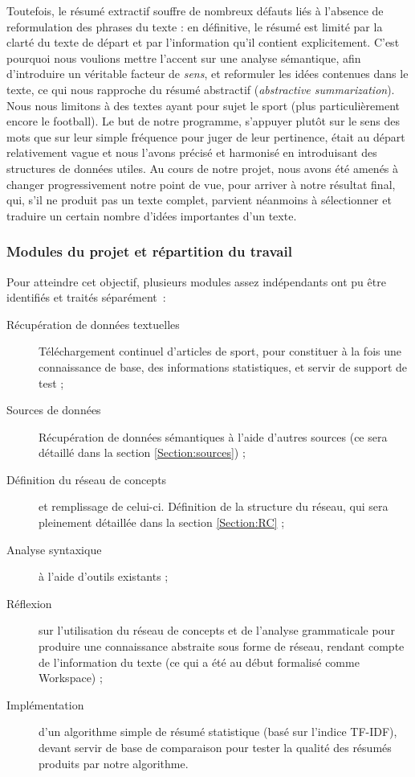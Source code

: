 \documentclass[a4paper, 12pt]{article}
\begin{document}
Toutefois, le résumé extractif souffre de nombreux défauts liés à l'absence de reformulation des phrases du texte : en définitive, le résumé est limité par la clarté du texte de départ et par l'information qu'il contient explicitement. C'est pourquoi nous voulions mettre l'accent sur une analyse sémantique, afin d'introduire un véritable facteur de \textit{sens}, et reformuler les idées contenues dans le texte, ce qui nous rapproche du résumé abstractif (\textit{abstractive summarization}).\\

Nous nous limitons à des textes ayant pour sujet le sport (plus particulièrement encore le football). Le but de notre programme, s'appuyer plutôt sur le sens des mots que sur leur simple fréquence pour juger de leur pertinence, était au départ relativement vague et nous l'avons précisé et harmonisé en introduisant des structures de données utiles. Au cours de notre projet, nous avons été amenés à changer progressivement notre point de vue, pour arriver à notre résultat final, qui, s'il ne produit pas un texte complet, parvient néanmoins à sélectionner et traduire un certain nombre d'idées importantes d'un texte.


\subsubsection{Modules du projet et répartition du travail}


Pour atteindre cet objectif, plusieurs modules assez indépendants ont pu être identifiés et traités séparément~:


\begin{description}
	\item[Récupération de données textuelles] Téléchargement continuel d'articles de sport, pour constituer à la fois une connaissance de base, des informations statistiques, et servir de support de test ;
	\item[Sources de données] Récupération de données sémantiques à l'aide d'autres sources (ce sera détaillé dans la section \ref{Section:sources}) ;
	\item[Définition du réseau de concepts] et remplissage de celui-ci. Définition de la structure du réseau, qui sera pleinement détaillée dans la section \ref{Section:RC} ;
	\item[Analyse syntaxique] à l'aide d'outils existants ;
	\item[Réflexion] sur l'utilisation du réseau de concepts et de l'analyse grammaticale pour produire une connaissance abstraite sous forme de réseau, rendant compte de l'information du texte (ce qui a été au début formalisé comme Workspace) ;
	\item[Implémentation] d'un algorithme simple de résumé statistique (basé sur l'indice TF-IDF), devant servir de base de comparaison pour tester la qualité des résumés produits par notre algorithme.
\end{description}
\end{document}
